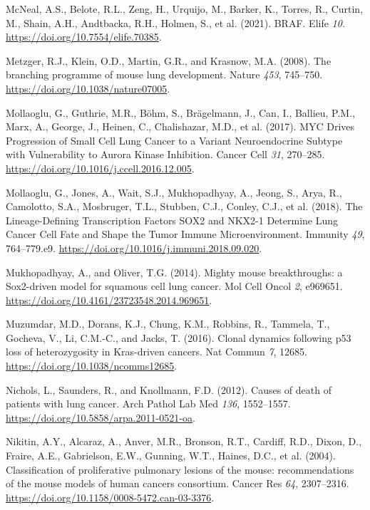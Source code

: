 \begin{CSLReferences}{0}{0}
\leavevmode{}%
McNeal, A.S., Belote, R.L., Zeng, H., Urquijo, M., Barker, K., Torres, R., Curtin, M., Shain, A.H., Andtbacka, R.H., Holmen, S., et al. (2021). BRAF. Elife \emph{10}. \url{https://doi.org/10.7554/elife.70385}.

\leavevmode{}%
Metzger, R.J., Klein, O.D., Martin, G.R., and Krasnow, M.A. (2008). The branching programme of mouse lung development. Nature \emph{453}, 745--750. \url{https://doi.org/10.1038/nature07005}.

\leavevmode{}%
Mollaoglu, G., Guthrie, M.R., Böhm, S., Brägelmann, J., Can, I., Ballieu, P.M., Marx, A., George, J., Heinen, C., Chalishazar, M.D., et al. (2017). MYC Drives Progression of Small Cell Lung Cancer to a Variant Neuroendocrine Subtype with Vulnerability to Aurora Kinase Inhibition. Cancer Cell \emph{31}, 270--285. \url{https://doi.org/10.1016/j.ccell.2016.12.005}.

\leavevmode{}%
Mollaoglu, G., Jones, A., Wait, S.J., Mukhopadhyay, A., Jeong, S., Arya, R., Camolotto, S.A., Mosbruger, T.L., Stubben, C.J., Conley, C.J., et al. (2018). The Lineage-Defining Transcription Factors SOX2 and NKX2-1 Determine Lung Cancer Cell Fate and Shape the Tumor Immune Microenvironment. Immunity \emph{49}, 764--779.e9. \url{https://doi.org/10.1016/j.immuni.2018.09.020}.

\leavevmode{}%
Mukhopadhyay, A., and Oliver, T.G. (2014). Mighty mouse breakthroughs: a Sox2-driven model for squamous cell lung cancer. Mol Cell Oncol \emph{2}, e969651. \url{https://doi.org/10.4161/23723548.2014.969651}.

\leavevmode{}%
Muzumdar, M.D., Dorans, K.J., Chung, K.M., Robbins, R., Tammela, T., Gocheva, V., Li, C.M.-C., and Jacks, T. (2016). Clonal dynamics following p53 loss of heterozygosity in Kras-driven cancers. Nat Commun \emph{7}, 12685. \url{https://doi.org/10.1038/ncomms12685}.

\leavevmode{}%
Nichols, L., Saunders, R., and Knollmann, F.D. (2012). Causes of death of patients with lung cancer. Arch Pathol Lab Med \emph{136}, 1552--1557. \url{https://doi.org/10.5858/arpa.2011-0521-oa}.

\leavevmode{}%
Nikitin, A.Y., Alcaraz, A., Anver, M.R., Bronson, R.T., Cardiff, R.D., Dixon, D., Fraire, A.E., Gabrielson, E.W., Gunning, W.T., Haines, D.C., et al. (2004). Classification of proliferative pulmonary lesions of the mouse: recommendations of the mouse models of human cancers consortium. Cancer Res \emph{64}, 2307--2316. \url{https://doi.org/10.1158/0008-5472.can-03-3376}.


\end{CSLReferences}
